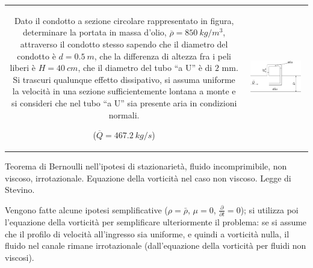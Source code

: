 \noindent
\begin{tabular}{cc}
\begin{minipage}[b]{0.60\textwidth}
\begin{exerciseS}
Dato il condotto a sezione circolare rappresentato in figura, 
determinare la portata in massa d'olio, $\overline{\rho} = 850\ kg/m^3$,
attraverso il condotto stesso sapendo che il diametro del condotto 
\`{e} $d=0.5\ m$, che la differenza di altezza fra i peli liberi 
\`{e} $H=40\ cm$, che il diametro del tubo ``a U'' \`{e} di $2$ mm. 
Si trascuri qualunque effetto dissipativo, si assuma
uniforme la velocit\`{a} in una sezione sufficientemente lontana a monte
e si consideri che nel tubo ``a U'' sia presente aria in condizioni normali.

($\overline{Q}= 467.2\  kg/s$)
\end{exerciseS}
\end{minipage}
&
\begin{minipage}{0.35\textwidth}
   \begin{center}
   \includegraphics[width=0.90\textwidth]{./fig/condottocircolare.eps}
   \end{center}
\end{minipage}
\end{tabular}

\sol

\partone
 Teorema di Bernoulli nell'ipotesi di stazionarietà, fluido incomprimibile, non viscoso, irrotazionale.
Equazione della vorticità nel caso non viscoso.
Legge di Stevino.

\parttwo
Vengono fatte alcune ipotesi semplificative ($\rho = \bar{\rho}$, $\mu=0$, $\frac{\partial}{\partial t}=0$); si utilizza poi l'equazione della vorticità per semplificare ulteriormente il problema: se si assume che il profilo di velocità all'ingresso sia uniforme, e quindi a vorticità nulla, il fluido nel canale rimane irrotazionale (dall'equazione della vorticità per fluidi non viscosi).

